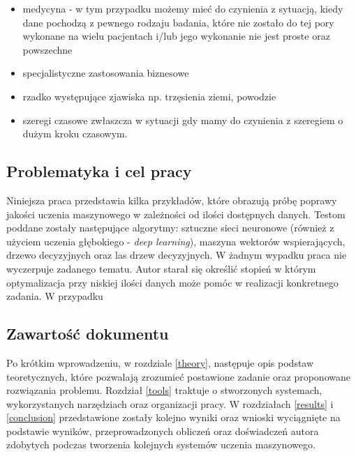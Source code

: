 \begin{itemize}
\item medycyna - w tym przypadku możemy mieć do czynienia z sytuacją, kiedy dane pochodzą z pewnego rodzaju badania, które nie zostało do tej pory wykonane na wielu pacjentach i/lub jego wykonanie nie jest proste oraz powszechne
\item specjalistyczne zastosowania biznesowe
\item rzadko występujące zjawiska np. trzęsienia ziemi, powodzie
\item szeregi czasowe  zwłaszcza w sytuacji gdy mamy do czynienia z szeregiem o dużym kroku czasowym.
\end{itemize}

\subsection{Problematyka i cel pracy}
Niniejsza praca przedstawia kilka przykładów, które obrazują próbę poprawy jakości uczenia maszynowego w zależności od ilości dostępnych danych. Testom poddane  zostały następujące algorytmy: sztuczne sieci neuronowe (również z użyciem uczenia głębokiego - \textit{deep learning}), maszyna wektorów wspierających, drzewo decyzyjnych oraz las drzew decyzyjnych. W żadnym wypadku praca nie wyczerpuje zadanego tematu. Autor starał się określić stopień w którym optymalizacja przy niskiej ilości danych może pomóc w realizacji konkretnego zadania. W przypadku 

\subsection{Zawartość dokumentu}
Po krótkim wprowadzeniu, w rozdziale \ref{theory}, następuje opis podstaw teoretycznych, które pozwalają zrozumieć postawione zadanie oraz proponowane rozwiązania problemu. Rozdział \ref{tools} traktuje o stworzonych systemach, wykorzystanych narzędziach oraz organizacji pracy. W rozdziałach \ref{results} i \ref{conclusion} przedstawione zostały kolejno wyniki oraz wnioski wyciągnięte na podstawie wyników, przeprowadzonych obliczeń oraz doświadczeń autora zdobytych podczas tworzenia kolejnych systemów uczenia maszynowego.



